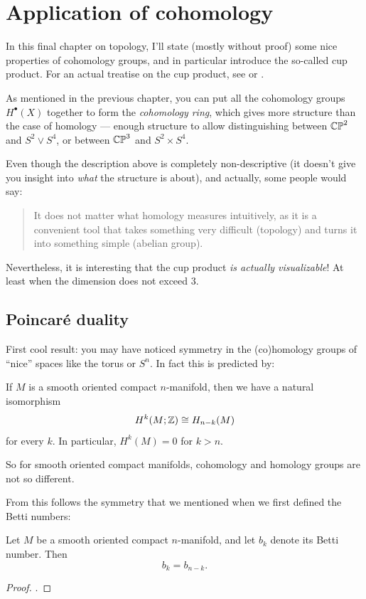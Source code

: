 \chapter{Application of cohomology}
\label{ch:application_of_cohomology}
In this final chapter on topology, I'll state (mostly without proof)
some nice properties of cohomology groups, and in particular
introduce the so-called cup product.
For an actual treatise on the cup product,
see \cite{ref:hatcher} or \cite{ref:maxim752}.

As mentioned in the previous chapter, you can put all the cohomology groups $H^\bullet(X)$ together
to form the \emph{cohomology ring}, which gives more structure than the case of homology ---
enough structure to allow distinguishing between $\mathbb{CP}^2$ and $S^2 \vee S^4$,
or between $\mathbb{CP}^3$ and $S^2 \times S^4$.

Even though the description above is completely non-descriptive (it doesn't give you insight into
\emph{what} the structure is about), and actually, some people would say:
\begin{quote}
	It does not matter what homology measures intuitively, as it is a convenient tool that takes
	something very difficult (topology) and turns it into something simple (abelian group).
\end{quote}
Nevertheless, it is interesting that the cup product \emph{is actually visualizable}!
At least when the dimension does not exceed $3$.

\section{Poincar\'e duality}
First cool result:
you may have noticed symmetry in the (co)homology groups of
``nice'' spaces like the torus or $S^n$.
In fact this is predicted by:
\begin{theorem}
	If $M$ is a smooth oriented compact $n$-manifold,
	then we have a natural isomorphism
	\[ H^k(M; \mathbb Z) \cong H_{n-k}(M) \]
	for every $k$.
	In particular, $H^k(M) = 0$ for $k > n$.
\end{theorem}
So for smooth oriented compact manifolds,
cohomology and homology groups are not so different.

From this follows the symmetry that we mentioned
when we first defined the Betti numbers:
\begin{corollary}
	Let $M$ be a smooth oriented compact $n$-manifold,
	and let $b_k$ denote its Betti number.
	Then \[ b_k = b_{n-k}. \]
\end{corollary}
\begin{proof}
	.
\end{proof}


